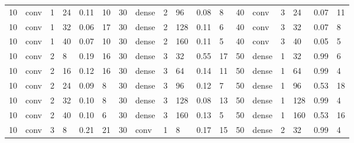 \begin{table}[t!]
{\begin{tabular}{@{}llllll|llllll|llllll@{}}
10          & conv       & 1          & 24         & 0.11         & 10           & 30          & dense      & 2          & 96         & 0.08         & 8            & 40          & conv       & 3          & 24         & 0.07         & 11           \\
10          & conv       & 1          & 32         & 0.06         & 17           & 30          & dense      & 2          & 128        & 0.11         & 6            & 40          & conv       & 3          & 32         & 0.07         & 8            \\
10          & conv       & 1          & 40         & 0.07         & 10           & 30          & dense      & 2          & 160        & 0.11         & 5            & 40          & conv       & 3          & 40         & 0.05         & 5            \\
10          & conv       & 2          & 8          & 0.19         & 16           & 30          & dense      & 3          & 32         & 0.55         & 17           & 50          & dense      & 1          & 32         & 0.99         & 6            \\
10          & conv       & 2          & 16         & 0.12         & 16           & 30          & dense      & 3          & 64         & 0.14         & 11           & 50          & dense      & 1          & 64         & 0.99         & 4            \\
10          & conv       & 2          & 24         & 0.09         & 8            & 30          & dense      & 3          & 96         & 0.12         & 7            & 50          & dense      & 1          & 96         & 0.53         & 18           \\
10          & conv       & 2          & 32         & 0.10         & 8            & 30          & dense      & 3          & 128        & 0.08         & 13           & 50          & dense      & 1          & 128        & 0.99         & 4            \\
10          & conv       & 2          & 40         & 0.10         & 6            & 30          & dense      & 3          & 160        & 0.13         & 5            & 50          & dense      & 1          & 160        & 0.53         & 16           \\
10          & conv       & 3          & 8          & 0.21         & 21           & 30          & conv       & 1          & 8          & 0.17         & 15           & 50          & dense      & 2          & 32         & 0.99         & 4            \\

\end{tabular}}
\end{table}
